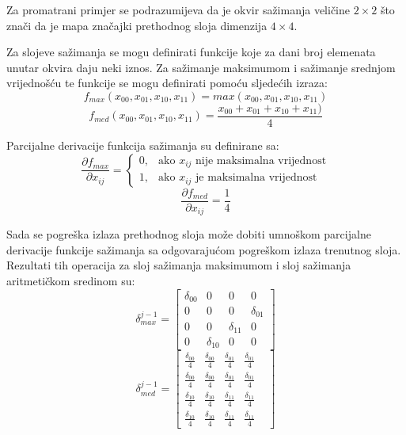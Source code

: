 \documentclass[times, utf8, zavrsni, numeric]{fer}
\begin{document}
Za promatrani primjer se podrazumijeva da je okvir sažimanja veličine $2 \times 2$ što znači da je mapa značajki prethodnog sloja dimenzija $4 \times 4$.

Za slojeve sažimanja se mogu definirati funkcije koje za dani broj elemenata unutar okvira daju neki iznos. Za sažimanje maksimumom i sažimanje srednjom vrijednošću te funkcije se mogu definirati pomoću sljedećih izraza:
\begin{equation}
f_{max}(x_{00}, x_{01}, x_{10}, x_{11}) = max(x_{00}, x_{01}, x_{10}, x_{11})
\end{equation}
\begin{equation}
f_{med}(x_{00}, x_{01}, x_{10}, x_{11}) = \frac{x_{00} + x_{01} + x_{10} + x_{11})}{4}
\end{equation}

Parcijalne derivacije funkcija sažimanja su definirane sa:
\begin{equation}
\dfrac{\partial f_{max}}{\partial x_{ij}} = \begin{cases}
    0, & \text{ako $x_{ij}$ nije maksimalna vrijednost}\\
    1, & \text{ako $x_{ij}$ je maksimalna vrijednost}
  \end{cases}
\end{equation}
\begin{equation}
\dfrac{\partial f_{med}}{\partial x_{ij}} = \frac{1}{4}
\end{equation}

Sada se pogreška izlaza prethodnog sloja može dobiti umnoškom parcijalne derivacije funkcije sažimanja sa odgovarajućom pogreškom izlaza trenutnog sloja. Rezultati tih operacija za sloj sažimanja maksimumom i sloj sažimanja aritmetičkom sredinom su:
\begin{equation}
\delta^{j-1}_{max} = \left[
\begin{matrix}
\delta_{00} & 0 & 0 & 0 \\
0 & 0 & 0 & \delta_{01} \\
0 & 0 & \delta_{11} & 0\\
0 & \delta_{10} & 0 & 0 
\end{matrix}
\right]
\end{equation}
\begin{equation}
\delta^{j-1}_{med} = \left[
\begin{matrix}
\frac{\delta_{00}}{4} & \frac{\delta_{00}}{4} & \frac{\delta_{01}}{4} & \frac{\delta_{01}}{4} & \\
\frac{\delta_{00}}{4} & \frac{\delta_{00}}{4} & \frac{\delta_{01}}{4} & \frac{\delta_{01}}{4} & \\
\frac{\delta_{10}}{4} & \frac{\delta_{10}}{4} & \frac{\delta_{11}}{4} & \frac{\delta_{11}}{4} & \\
\frac{\delta_{10}}{4} & \frac{\delta_{10}}{4} & \frac{\delta_{11}}{4} & \frac{\delta_{11}}{4} &
\end{matrix}
\right]
\end{equation}
\end{document}
